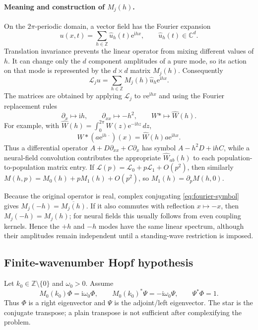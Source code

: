 \documentclass[11pt]{article}
\newcommand{\ii}{\mathrm{i}}
\newcommand{\ee}{\mathrm{e}}
\newcommand{\cL}{\mathcal{L}}
\begin{document}
\paragraph{Meaning and construction of $M_j(h)$.}
On the $2\pi$-periodic domain, a vector field has the Fourier expansion
\begin{equation}
  u(x,t)=\sum_{h\in\mathbb Z}\widehat u_h(t)\ee^{\ii hx},
  \qquad \widehat u_h(t)\in\mathbb C^d.
\end{equation}
Translation invariance prevents the linear operator from mixing different
values of $h$.  It can change only the $d$ component amplitudes of a pure
mode, so its action on that mode is represented by the $d\times d$ matrix
$M_j(h)$.  Consequently
\begin{equation}
  \cL_j u=\sum_{h\in\mathbb Z}M_j(h)\widehat u_h\ee^{\ii hx}.
\end{equation}
The matrices are obtained by applying $\cL_j$ to $v\ee^{\ii hx}$ and using
the Fourier replacement rules
\begin{equation}
  \partial_x\mapsto \ii h,\qquad
  \partial_{xx}\mapsto-h^2,\qquad
  W*\mapsto\widehat W(h).
\end{equation}
For example, with
$\widehat W(h)=\int_0^{2\pi}W(z)\ee^{-\ii hz}\,dz$,
\begin{equation}
  W*\left(a\ee^{\ii h\,\cdot}\right)(x)
  =\widehat W(h)a\ee^{\ii hx}.
\end{equation}
Thus a differential operator $A+D\partial_{xx}+C\partial_x$ has symbol
$A-h^2D+\ii hC$, while a neural-field convolution contributes the appropriate
$\widehat W_{ab}(h)$ to each population-to-population matrix entry.  If
$\cL(p)=\cL_0+p\cL_1+O(p^2)$, then similarly
$M(h,p)=M_0(h)+pM_1(h)+O(p^2)$, so $M_1(h)=\partial_pM(h,0)$.

Because the original operator is real, complex conjugating
\eqref{eq:fourier-symbol} gives
$M_j(-h)=\overline{M_j(h)}$.  If it also commutes with reflection
$x\mapsto-x$, then $M_j(-h)=M_j(h)$; for neural fields this usually follows
from even coupling kernels.  Hence the $+h$ and $-h$ modes have the same
linear spectrum, although their amplitudes remain independent until a
standing-wave restriction is imposed.

\subsection{Finite-wavenumber Hopf hypothesis}

Let $k_0\in\mathbb{Z}\setminus\{0\}$ and $\omega_0>0$.  Assume
\begin{equation}
  M_0(k_0)\Phi=\ii\omega_0\Phi,
  \qquad
  M_0(k_0)^*\Psi=-\ii\omega_0\Psi,
  \qquad
  \Psi^*\Phi=1.
  \label{eq:eigenvectors}
\end{equation}
Thus $\Phi$ is a right eigenvector and $\Psi$ is the adjoint/left
eigenvector.  The star is the conjugate transpose; a plain transpose is not
sufficient after complexifying the problem.
\end{document}
